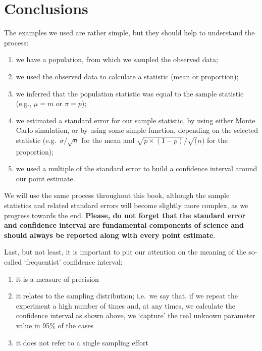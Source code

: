 \documentclass[a4paper,12pt,oneside]{book}
\providecommand{\tightlist}{%
  \setlength{\itemsep}{0pt}\setlength{\parskip}{0pt}}
\begin{document}
\hypertarget{conclusions-2}{%
\section{Conclusions}\label{conclusions-2}}

The examples we used are rather simple, but they should help to understand the process:

\begin{enumerate}
\def\labelenumi{\arabic{enumi}.}
\tightlist
\item
  we have a population, from which we sampled the observed data;
\item
  we used the observed data to calculate a statistic (mean or proportion);
\item
  we inferred that the population statistic was equal to the sample statistic (e.g., \(\mu = m\) or \(\pi = p\));
\item
  we estimated a standard error for our sample statistic, by using either Monte Carlo simulation, or by using some simple function, depending on the selected statistic (e.g.~\(\sigma/\sqrt{n}\) for the mean and \(\sqrt{p \times (1 - p)}/\sqrt(n)\) for the proportion);
\item
  we used a multiple of the standard error to build a confidence interval around our point estimate.
\end{enumerate}

We will use the same process throughout this book, although the sample statistics and related standard errors will become slightly more complex, as we progress towards the end. \textbf{Please, do not forget that the standard error and confidence interval are fundamental components of science and should always be reported along with every point estimate}.

Last, but not least, it is important to put our attention on the meaning of the so-called `frequentist' confidence interval:

\begin{enumerate}
\def\labelenumi{\arabic{enumi}.}
\tightlist
\item
  it is a measure of precision
\item
  it relates to the sampling distribution; i.e.~we say that, if we repeat the experiment a high number of times and, at any times, we calculate the confidence interval as shown above, we `capture' the real unknown parameter value in 95\% of the cases
\item
  it does not refer to a single sampling effort
\end{enumerate}
\end{document}
